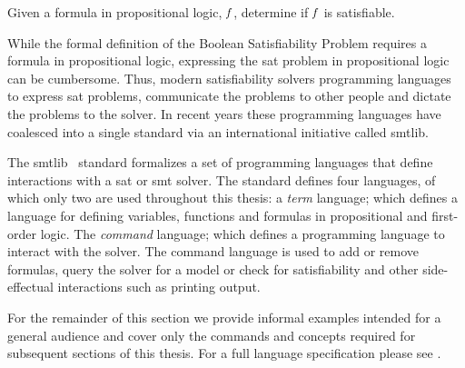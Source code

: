 \begin{definition}
  Given a formula in propositional logic, $\mathit{f}$, determine if $\mathit{f}$ is
  satisfiable.
\end{definition}

While the formal definition of the Boolean Satisfiability Problem requires a
formula in propositional logic, expressing the \ac{sat} problem in propositional
logic can be cumbersome. Thus, modern satisfiability solvers programming
languages to express \ac{sat} problems, communicate the problems to other people
and dictate the problems to the solver. In recent years these programming
languages have coalesced into a single standard via an international initiative
called \acl{smtlib}.

The \acl{smtlib}~\cite{BarFT-SMTLIB} standard formalizes a set of programming
languages that define interactions with a \ac{sat} or \ac{smt} solver. The
standard defines four languages, of which only two are used throughout this
thesis: a \emph{term} language; which defines a language for defining variables,
functions and formulas in propositional and first-order logic. The
\emph{command} language; which defines a programming language to interact with
the solver. The command language is used to add or remove formulas, query the
solver for a model or check for satisfiability and other side-effectual
interactions such as printing output.

For the remainder of this section we provide informal examples intended for a
general audience and cover only the commands and concepts required for
subsequent sections of this thesis. For a full language specification please see
\citet{BarFT-SMTLIB}.

